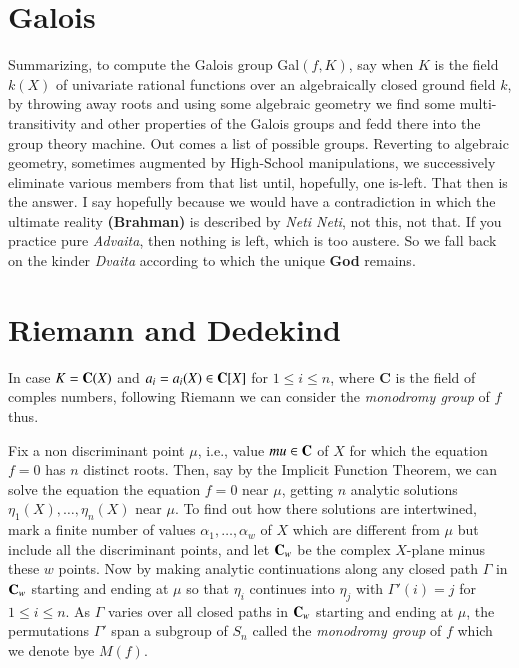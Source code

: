 \section{Galois} 

Summarizing, to compute the Galois group Gal$(f, K)$, say when $K$ is the field $k(X)$ of univariate rational functions over an algebraically closed ground field $k$, by throwing away roots and using some algebraic geometry we find some multi-transitivity and other properties of the Galois groups and fedd there into the group theory machine. Out comes a list of possible groups. Reverting to algebraic geometry, sometimes augmented by High-School manipulations, we successively eliminate various members from that list until, hopefully, one is-left. That then is the answer. I say hopefully because we would have a contradiction in which the ultimate reality {\bf (Brahman)} is described by {\it Neti Neti}, not this, not that. If you practice pure {\it Advaita}, then nothing is left, which is too austere. So we fall back on the kinder {\it Dvaita} according to which the unique {\bf God} remains. 

\section{Riemann and Dedekind}

In case $K=\mathbf{C}(X)$ and $a_{i}=a_{i}(X)\in \mathbf{C}[X]$ for $1\leq i \leq n$, where {\bf C} is the field  of comples numbers, following Riemann \cite{art1-key53} we can consider the {\it monodromy group} of $f$ thus.

Fix a non discriminant point $\mu$, i.e., value $mu \in \mathbf{C}$ of $X$ for which the equation $f=0$ has $n$ distinct roots. Then, say by the Implicit Function Theorem, we can solve the equation the equation $f=0$ near $\mu$, getting $n$ analytic solutions $\eta _{1}(X), \ldots, \eta _{n}(X)$ near $\mu$. To find out how there solutions are intertwined, mark a finite number of values $\alpha_{1}, \ldots, \alpha_{w}$ of $X$ which are different from $\mu$ but include all the discriminant points, and let $\mathbf{C}_{w}$ be the complex $X$-plane minus these $w$ points. Now by making analytic continuations along any closed path $\Gamma$ in $\mathbf{C}_{w}$ starting and ending at $\mu$ so that $\eta_{i}$ continues into $\eta_{j}$ with $\Gamma'(i)= j$ for $1 \leq i \leq n$. As $\Gamma$ varies over all closed paths in $\mathbf{C}_{w}$ starting and ending at $\mu$, the permutations $\Gamma'$ span a subgroup of $S_{n}$ called the {\it monodromy group} of  $f$ which we denote bye $M(f)$.   
 
